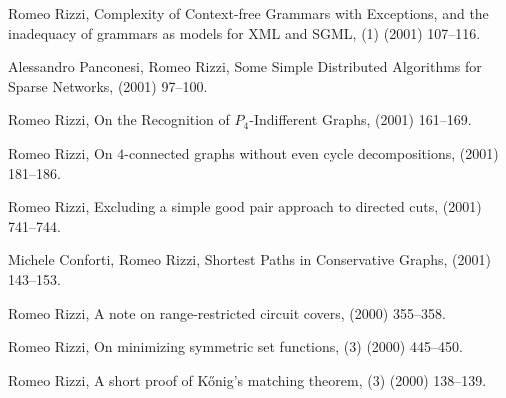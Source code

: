 \begin{etaremune}
  \item {\sc Romeo Rizzi},
   \newblock  Complexity of Context-free Grammars with Exceptions,
              and the inadequacy of grammars as models for XML and SGML,
   (1) (2001) 107--116.

  \item {\sc Alessandro Panconesi, Romeo Rizzi},
   \newblock  Some Simple Distributed Algorithms for Sparse Networks,
    (2001) 97--100.

  \item {\sc Romeo Rizzi},
   \newblock  On the Recognition of $P_4$-Indifferent Graphs,
    (2001) 161--169.

  \item {\sc Romeo Rizzi},
   \newblock  On $4$-connected graphs without even cycle decompositions,
    (2001) 181--186.

  \item {\sc Romeo Rizzi},
   \newblock  Excluding a simple good pair approach to directed cuts,
    (2001) 741--744.

  \item {\sc Michele Conforti, Romeo Rizzi},  
   \newblock  Shortest Paths in Conservative Graphs,
    (2001) 143--153.

  \item {\sc Romeo Rizzi},
   \newblock  A note on range-restricted circuit covers,
    (2000) 355--358.

  \item {\sc Romeo Rizzi},
   \newblock  On minimizing symmetric set functions,
   (3) (2000) 445--450.

  \item {\sc Romeo Rizzi},
   \newblock  A short proof of K\H{o}nig's matching theorem,
   (3) (2000) 138--139.


\end{etaremune}
